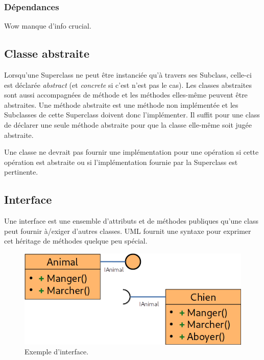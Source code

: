 \documentclass[../Syllabus.tex]{subfiles}
\begin{document}
\clearpage

\subsubsection{Dépendances}

Wow manque d'info crucial.

\subsection{Classe abstraite}

Lorsqu'une Superclass ne peut être instanciée qu'à travers ses Subclass, celle-ci est déclarée \textit{abstract} (et \textit{concrete} si c'est n'est pas le cas). Les classes abstraites sont aussi accompagnées de méthode et les méthodes elles-même peuvent être abstraites. Une méthode abstraite est une méthode non implémentée et les Subclasses de cette Superclass doivent donc l'implémenter. Il suffit pour une class de déclarer une seule méthode abstraite pour que la classe elle-même soit jugée abstraite.

Une classe ne devrait pas fournir une implémentation pour une opération si cette opération est abstraite ou si l'implémentation fournie par la Superclass est pertinente.

\subsection{Interface}

Une interface est une ensemble d'attributs et de méthodes publiques qu'une class peut fournir à/exiger d'autres classes. UML fournit une syntaxe pour exprimer cet héritage de méthodes quelque peu spécial.

\begin{figure}[htp]
    \centering
    \includegraphics[width=14cm]{./img/chapter2-interface.png}
    \caption{Exemple d'interface.}
    \label{fig:chapter2-interface}
\end{figure}
\end{document}
